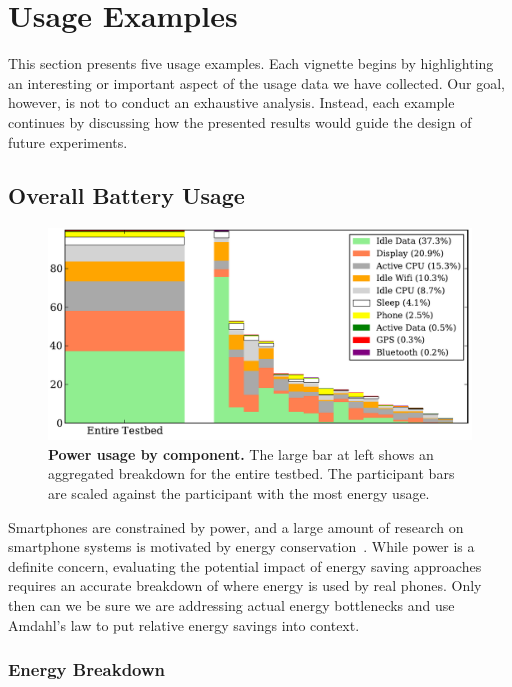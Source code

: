 \section{Usage Examples}
\label{sec-usage}


This section presents five \PhoneLab{} usage examples. Each vignette begins by
highlighting an interesting or important aspect of the usage data we have
collected. Our goal, however, is not to conduct an exhaustive analysis.
Instead, each example continues by discussing how the presented results would
guide the design of future \PhoneLab{} experiments.

\subsection{Overall Battery Usage}
\label{subsec-batteryoverview}

\begin{figure}[t]
\includegraphics[width=\textwidth]{./figures/power/breakdown/graph.pdf}
\caption{\textbf{Power usage by component.} The large bar at left shows an
aggregated breakdown for the entire testbed. The participant bars are scaled
against the participant with the most energy usage.}
\label{figure-batteryoverview}
\end{figure}

Smartphones are constrained by power, and a large amount of research on
smartphone systems is motivated by energy
conservation~\cite{FIXME,FIXME,FIXME}. While power is a definite concern,
evaluating the potential impact of energy saving approaches requires an
accurate breakdown of where energy is used by real phones. Only then can we
be sure we are addressing actual energy bottlenecks and use Amdahl's law to
put relative energy savings into context.

\subsubsection{Energy Breakdown}

